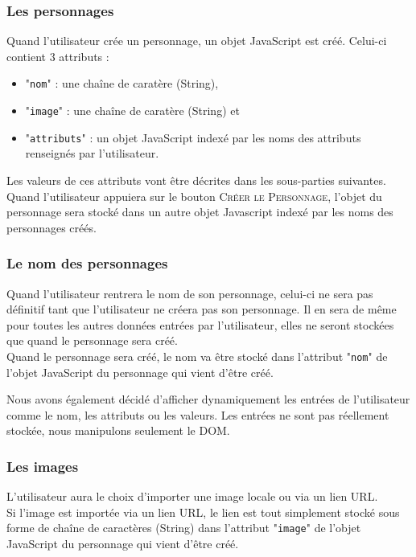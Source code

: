 \documentclass{article}
\begin{document}
            \subsubsection{Les personnages}
                Quand l'utilisateur crée un personnage, un objet JavaScript est créé. Celui-ci contient 3 attributs :
                \begin{itemize}
                    \item "\texttt{nom}" : une chaîne de caratère (String),
                    \item "\texttt{image}" : une chaîne de caratère (String) et
                    \item "\texttt{attributs}" : un objet JavaScript indexé par les noms des attributs renseignés par l'utilisateur.
                \end{itemize}
                Les valeurs de ces attributs vont être décrites dans les sous-parties suivantes.\\
                Quand l'utilisateur appuiera sur le bouton \textsc{Créer le Personnage}, l'objet du personnage sera stocké dans un autre objet Javascript indexé par les noms des personnages créés.
            
            \subsubsection{Le nom des personnages}
                Quand l'utilisateur rentrera le nom de son personnage, celui-ci ne sera pas définitif tant que l'utilisateur ne créera pas son personnage. Il en sera de même pour toutes les autres données entrées par l'utilisateur, elles ne seront stockées que quand le personnage sera créé.\\
                Quand le personnage sera créé, le nom va être stocké dans l'attribut "\texttt{nom}" de l'objet JavaScript du personnage qui vient d'être créé.\\
                \par Nous avons également décidé d'afficher dynamiquement les entrées de l'utilisateur comme le \textsf{nom}, les \textsf{attributs} ou les \textsf{valeurs}. Les entrées ne sont pas réellement stockée, nous manipulons seulement le DOM.
            
            \subsubsection{Les images}
                L'utilisateur aura le choix d'importer une image locale ou via un lien URL.\\
                Si l'image est importée via un lien URL, le lien est tout simplement stocké sous forme de chaîne de caractères (String) dans l'attribut "\texttt{image}" de l'objet JavaScript du personnage qui vient d'être créé.
            
\end{document}
